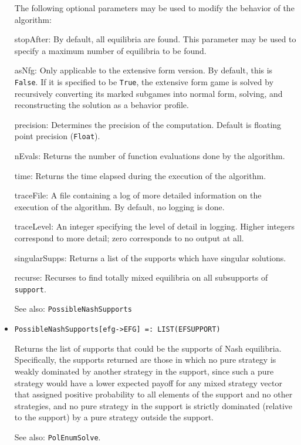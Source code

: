 \begin{itemize}
The following optional parameters may be used to modify the behavior
of the algorithm:
\bd
\item
[stopAfter:] By default, all equilibria are found.  This parameter may
be used to specify a maximum number of equilibria to be found.
\item
[asNfg:] Only applicable to the extensive form version.  By default,
this is \verb+False+.  If it is specified to be \verb+True+, the
extensive form game is solved by recursively converting its marked
subgames into normal form, solving, and reconstructing the solution as
a behavior profile.
\item
[precision:] Determines the precision of the computation. Default is
floating point precision (\verb+Float+). 
\item
[nEvals:] Returns the number of function evaluations done by the
algorithm.
\item
[time:] Returns the time elapsed during the execution
of the algorithm.
\item
[traceFile:] A file containing a log of more detailed information on the
execution of the algorithm.  By default, no logging is done.
\item
[traceLevel:] An integer specifying the level of detail in logging.
Higher integers correspond to more detail; zero corresponds to no output
at all.
\item
[singularSupps:] Returns a list of the supports which have singular solutions. 
\item
[recurse:] Recurses to find totally mixed equilibria on all
subsupports of \verb+support+.
\ed

\item [See also:] \verb+PossibleNashSupports+
\ed

\item{}
\protect \large \begin{verbatim}
PossibleNashSupports[efg->EFG] =: LIST(EFSUPPORT) 
\end{verbatim} \normalsize

\bd
Returns the list of supports that could be the supports of Nash
equilibria.  Specifically, the supports returned are those in which no
pure strategy is weakly dominated by another strategy in the support,
since such a pure strategy would have a lower expected payoff for any
mixed strategy vector that assigned positive probability to all
elements of the support and no other strategies, and no pure strategy
in the support is strictly dominated (relative to the support) by a
pure strategy outside the support.
\item [See also:] \verb+PolEnumSolve+.
\ed


\end{itemize}
